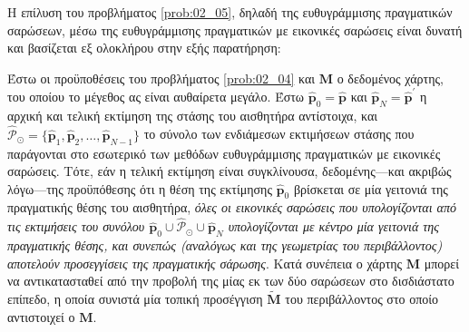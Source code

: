 Η επίλυση του προβλήματος \ref{prob:02_05}, δηλαδή της ευθυγράμμισης
πραγματικών σαρώσεων, μέσω της ευθυγράμμισης πραγματικών με εικονικές σαρώσεις
είναι δυνατή και βασίζεται εξ ολοκλήρου στην εξής παρατήρηση:

Έστω οι προϋποθέσεις του προβλήματος \ref{prob:02_04} και $\bm{M}$ ο δεδομένος
χάρτης, του οποίου το μέγεθος ας είναι αυθαίρετα μεγάλο. Έστω $\hat{\bm{p}}_0 =
\hat{\bm{p}}$ και $\hat{\bm{p}}_N = \hat{\bm{p}}^\prime$ η αρχική και τελική
εκτίμηση της στάσης του αισθητήρα αντίστοιχα, και $\hat{\mathcal{P}}_\odot =
\{\hat{\bm{p}}_1, \hat{\bm{p}}_2,\dots, \hat{\bm{p}}_{N-1}\}$ το σύνολο των
ενδιάμεσων εκτιμήσεων στάσης που παράγονται στο εσωτερικό των μεθόδων
ευθυγράμμισης πραγματικών με εικονικές σαρώσεις. Τότε, εάν η τελική εκτίμηση
είναι συγκλίνουσα, δεδομένης---και ακριβώς λόγω---της προϋπόθεσης ότι η θέση
της εκτίμησης $\hat{\bm{p}}_0$ βρίσκεται σε μία γειτονιά της πραγματικής θέσης
του αισθητήρα, \textit{όλες οι εικονικές σαρώσεις που υπολογίζονται από τις
εκτιμήσεις του συνόλου $\hat{\bm{p}}_0 \cup \hat{\mathcal{P}}_\odot \cup
\hat{\bm{p}}_N$ υπολογίζονται με κέντρο μία γειτονιά της πραγματικής θέσης, και
συνεπώς (αναλόγως και της γεωμετρίας του περιβάλλοντος) αποτελούν προσεγγίσεις
της πραγματικής σάρωσης}. Κατά συνέπεια ο χάρτης $\bm{M}$ μπορεί να
αντικατασταθεί από την προβολή της μίας εκ των δύο σαρώσεων στο δισδιάστατο
επίπεδο, η οποία συνιστά μία τοπική προσέγγιση $\widetilde{\bm{M}}$ του
περιβάλλοντος στο οποίο αντιστοιχεί ο $\bm{M}$.

